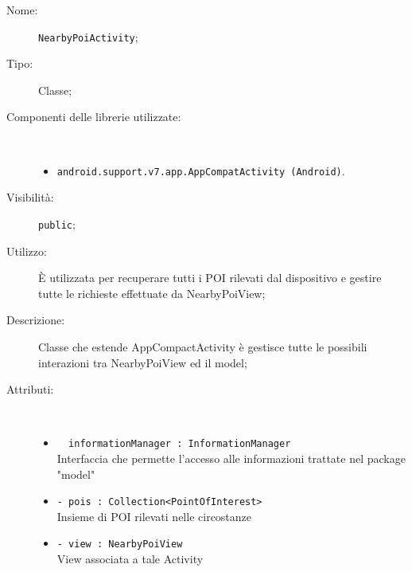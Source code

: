 \documentclass[../DefinizioneDiProdotto.tex]{subfiles}
\begin{document}
\begin{description}
	\item[Nome:] \texttt{NearbyPoiActivity};
	\item[Tipo:] Classe;
	\item[Componenti delle librerie utilizzate:] \
	\begin{itemize}
		\item \texttt{android.support.v7.app.AppCompatActivity (Android)}.
		
	\end{itemize}
	\item[Visibilità:] \texttt{public};
	\item[Utilizzo:] È utilizzata per recuperare tutti i POI rilevati dal dispositivo e gestire tutte le richieste effettuate da NearbyPoiView;
	\item[Descrizione:] Classe che estende AppCompactActivity è gestisce tutte le possibili interazioni tra NearbyPoiView ed il model;
	\item[Attributi:] \
	\begin{itemize}
		\item \texttt{~ informationManager : InformationManager}\\
		Interfaccia che permette l'accesso alle informazioni trattate nel package "model"
		
		\item \texttt{- pois : Collection<PointOfInterest>}\\
		Insieme di POI rilevati nelle circostanze
		
		\item \texttt{- view : NearbyPoiView}\\
		View associata a tale Activity
		

\end{itemize}
\end{description}
\end{document}

